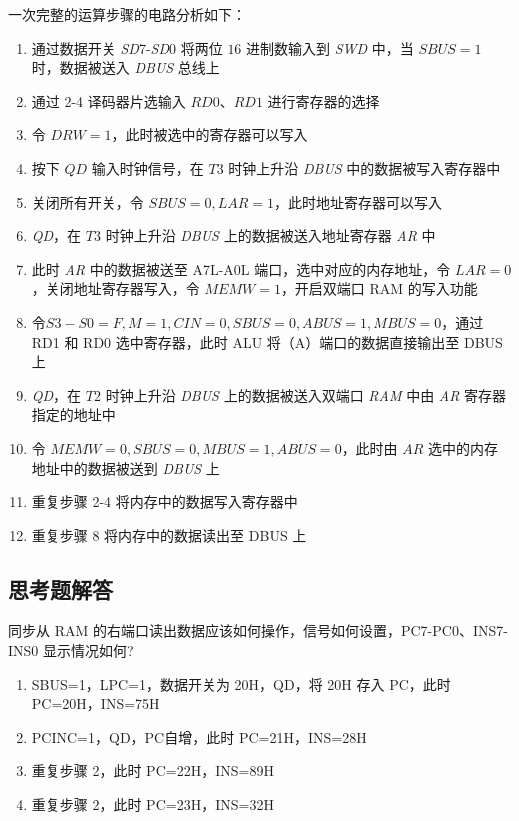         \par 一次完整的运算步骤的电路分析如下：
        \begin{enumerate}
            \item 通过数据开关 \textit{SD}7-\textit{SD}0 将两位 $16$ 进制数输入到 \textit{SWD} 中，当 $SBUS = 1$ 时，数据被送入 \textit{DBUS} 总线上
            \item 通过 2-4 译码器片选输入 $RD0$、$RD1$ 进行寄存器的选择
            \item 令 $DRW = 1$，此时被选中的寄存器可以写入
            \item 按下 $QD$ 输入时钟信号，在 $T3$ 时钟上升沿 \textit{DBUS} 中的数据被写入寄存器中
            \item 关闭所有开关，令 $SBUS = 0, LAR = 1$，此时地址寄存器可以写入
            \item \textit{QD}，在 $T3$ 时钟上升沿 \textit{DBUS} 上的数据被送入地址寄存器 \textit{AR} 中
            \item 此时 \textit{AR} 中的数据被送至 A7L-A0L 端口，选中对应的内存地址，令 $LAR=0$，关闭地址寄存器写入，令 $MEMW=1$，开启双端口 RAM 的写入功能
            \item 令$S3-S0 = F, M = 1, CIN = 0, SBUS = 0, ABUS = 1, MBUS = 0$，通过 RD1 和 RD0 选中寄存器，此时 ALU 将（A）端口的数据直接输出至 DBUS 上
            \item \textit{QD}，在 $T2$ 时钟上升沿 \textit{DBUS} 上的数据被送入双端口 \textit{RAM} 中由 \textit{AR} 寄存器指定的地址中
            \item 令 $MEMW=0, SBUS=0, MBUS=1, ABUS=0$，此时由 $AR$ 选中的内存地址中的数据被送到 \textit{DBUS} 上
            \item 重复步骤 2-4 将内存中的数据写入寄存器中
            \item 重复步骤 8 将内存中的数据读出至 DBUS 上
        \end{enumerate}

        \subsection{思考题解答}
        \begin{problem}
            同步从 RAM 的右端口读出数据应该如何操作，信号如何设置，PC7-PC0、INS7- INS0 显示情况如何?
        \end{problem}
        \begin{solution}
            \begin{enumerate}
                \item SBUS=1，LPC=1，数据开关为 20H，QD，将 20H 存入 PC，此时 PC=20H，INS=75H
                \item PCINC=1，QD，PC自增，此时 PC=21H，INS=28H
                \item 重复步骤 2，此时 PC=22H，INS=89H
                \item 重复步骤 2，此时 PC=23H，INS=32H
            \end{enumerate}
        \end{solution}
    
